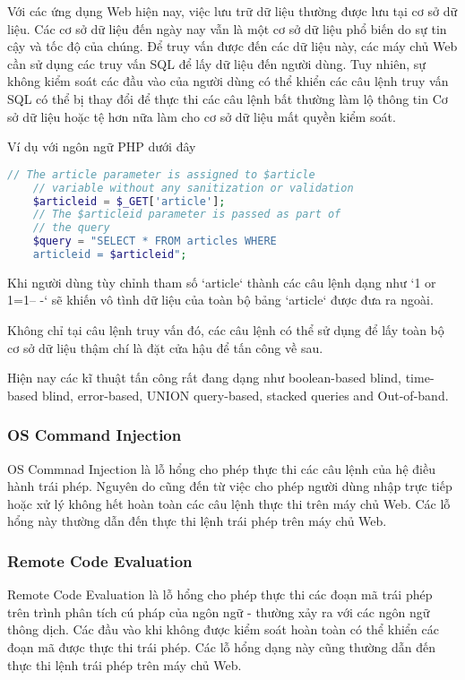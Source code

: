 \documentclass[./../main.tex]{subfiles}
\begin{document}
Với các ứng dụng Web hiện nay, việc lưu trữ dữ liệu thường được lưu tại
cơ sở dữ liệu. Các cơ sở dữ liệu đến ngày nay vẫn là một cơ sở dữ liệu
phổ biến do sự tin cậy và tốc độ của chúng. Để truy vấn được đến các dữ
liệu này, các máy chủ Web cần sử dụng các truy vấn SQL để lấy dữ liệu đến
người dùng. Tuy nhiên, sự không kiểm soát các đầu vào của người dùng có
thể khiển các câu lệnh truy vấn SQL có thể bị thay đổi để thực thi các câu
lệnh bất thường làm lộ thông tin Cơ sở dữ liệu hoặc tệ hơn nữa làm cho cơ
sở dữ liệu mất quyền kiểm soát.

Ví dụ với ngôn ngữ PHP dưới đây
\begin{lstlisting}[language=php, caption=SQL Injection]
    // The article parameter is assigned to $article
    // variable without any sanitization or validation
    $articleid = $_GET['article'];
    // The $articleid parameter is passed as part of
    // the query
    $query = "SELECT * FROM articles WHERE
    articleid = $articleid";
\end{lstlisting}
Khi người dùng tùy chỉnh tham số `article` thành các câu lệnh dạng như
`1 or 1=1-- -` sẽ khiến vô tình dữ liệu của toàn bộ bảng `article` được
đưa ra ngoài.

Không chỉ tại câu lệnh truy vấn đó, các câu lệnh có thể sử dụng để lấy toàn
bộ cơ sở dữ liệu thậm chí là đặt cửa hậu để tấn công về sau.

Hiện nay các kĩ thuật tấn công rất đang dạng như boolean-based blind,
time-based blind, error-based, UNION query-based, stacked queries and
Out-of-band.

\subsubsection{OS Command Injection}
OS Commnad Injection là lỗ hổng cho phép thực thi các câu lệnh
của hệ điều hành trái phép. Nguyên do cũng đến từ việc cho phép người dùng
nhập trực tiếp hoặc xử lý không hết hoàn toàn các câu lệnh thực thi trên
máy chủ Web. Các lỗ hổng này thường dẫn đến thực thi lệnh trái phép trên
máy chủ Web.

\subsubsection{Remote Code Evaluation}
Remote Code Evaluation là lỗ hổng cho phép thực thi các đoạn mã trái phép trên trình
phân tích cú pháp của ngôn ngữ - thường xảy ra với các ngôn ngữ thông dịch.
Các đầu vào khi không được kiểm soát hoàn toàn có thể khiển các đoạn mã
được thực thi trái phép. Các lỗ hổng dạng này cũng thường dẫn đến thực thi
lệnh trái phép trên máy chủ Web.
\end{document}
